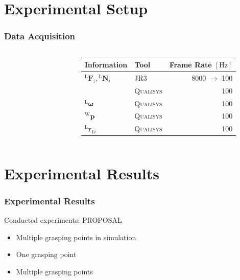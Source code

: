 \documentclass[student,noshadow]{ITRslides}
\renewcommand{\vec}[1]{\boldsymbol{#1}}
\renewcommand{\vec}[1]{\boldsymbol{#1}}
\newcommand{\scr}[1]{\mathrm{#1}}
\begin{document}
\section{Experimental Setup}
\begin{frame}
	\frametitle{Data Acquisition}
	\begin{columns}
	\begin{column}{0.35\textwidth}
				\begin{figure}
					\centering
					
				\end{figure}	
		 	\end{column}
		 	\begin{column}{0.65\textwidth}
		 	\begin{tabular}{llr}
				\toprule
				Information    & Tool & Frame Rate $\left[\mathrm{Hz}\right]$ \\
				\midrule
				${^\scr{L}}\vec{F}_{i},{^\scr{L}}\vec{N}_{i}$      & \textsc{JR3}    & 8000 $\rightarrow$ 100      \\
				          & \textsc{Qualisys}        & 100       \\
				$^\scr{L}\vec{\omega}$       & \textsc{Qualisys}     & 100      \\
				$^\scr{W}\vec{p}$       & \textsc{Qualisys}     & 100      \\
				$^\scr{L}\vec{r}_{1i}$ & \textsc{Qualisys}      & 100       \\
				\bottomrule
			\end{tabular}
		 	\end{column}
	\end{columns}
\end{frame}

%	
%		

\section{Experimental Results}

\begin{frame}
	\frametitle{Experimental Results}
	Conducted experiments: PROPOSAL
	\begin{itemize}
		\item Multiple grasping points in simulation
		\item One grasping point
		\item Multiple grasping points
	\end{itemize}
\end{frame}
\end{document}
